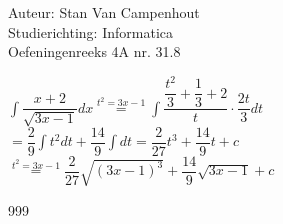 \documentclass[a4paper]{article}
\begin{document}
  
\noindent \large Auteur: Stan Van Campenhout \\
\noindent \large Studierichting:  Informatica\\
\noindent \large Oefeningenreeks 4A nr. 31.8\\

\medskip

\normalsize

$ \displaystyle\int \dfrac{x+2}{\sqrt{3x-1}} dx \stackrel{t^2 = 3x-1}{=} \displaystyle\int\dfrac{\dfrac{t^2}{3}+\dfrac{1}{3}+2}{t}\cdot\dfrac{2t}{3}dt $\\

$ = \dfrac{2}{9}\displaystyle\int t^2dt + \dfrac{14}{9}\displaystyle\int dt = \dfrac{2}{27}t^3+\dfrac{14}{9}t+c $\\

$ \stackrel{t^2 = 3x-1}{=} \dfrac{2}{27}\sqrt{\left(3x-1\right)^3}+\dfrac{14}{9}\sqrt{3x-1} + c $\\

\begin{thebibliography}{999}
\end{thebibliography}
\end{document}
